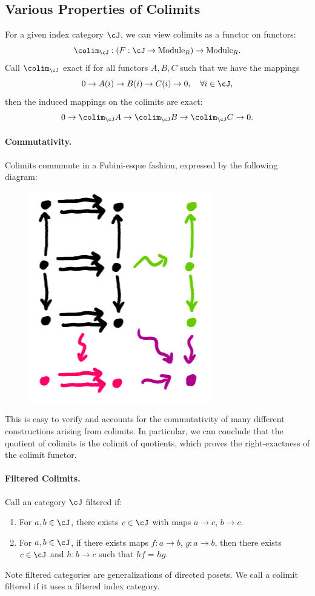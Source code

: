 \subsection{Various Properties of Colimits}

For a given index category $\cJ$, we can view colimits as a functor on functors:
\[
    \colim_{\cJ}: (F: \cJ \to \text{Module}_R) \to \text{Module}_R.
\]
Call $\colim_{\cJ}$ exact if for all functors $A, B, C$ such that we have the mappings
\[
    0 \to A(i) \to B(i) \to C(i) \to 0, \quad \forall i \in \cJ,
\]
then the induced mappings on the colimits are exact:
\[
    0 \to \colim_{\cJ}A \to \colim_{\cJ}B \to \colim_{\cJ}C \to 0.
\]

\paragraph{Commutativity.} Colimits commmute in a Fubini-esque fashion, expressed by the following diagram:
\begin{figure}[H]
    \centering
    \includegraphics[width=0.2\linewidth]{figures/colim-comm.png}
\end{figure}
This is easy to verify and accounts for the commutativity of many different constructions arising from colimits. In particular, we can conclude that the quotient of colimits is the colimit of quotients, which proves the right-exactness of the colimit functor.

\paragraph{Filtered Colimits.} Call an category $\cJ$ filtered if:
\begin{enumerate}
    \item For $a, b \in \cJ$, there exists $c \in \cJ$ with maps $a \to c$, $b \to c$.
    \item For $a, b \in \cJ$, if there exists maps $f: a \to b$, $g: a \to b$, then there exists $c \in \cJ$ and $h: b \to c$ such that $hf = hg$.
\end{enumerate}
Note filtered categories are generalizations of directed posets. We call a colimit filtered if it uses a filtered index category.

